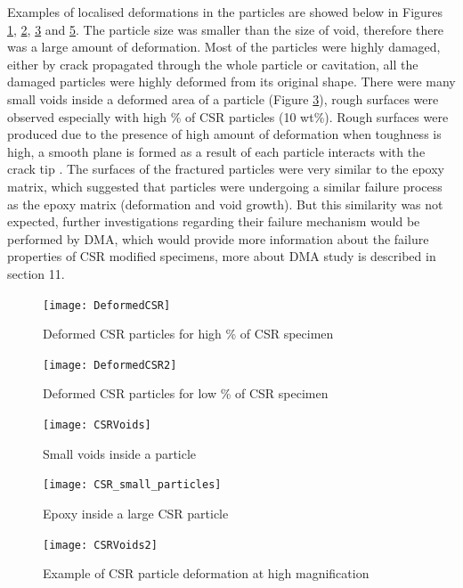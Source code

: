 \documentclass[numbers=noendperiod,chapterprefix=on]{icldt} %
\begin{document}
{Examples of localised deformations in the particles are showed below in Figures \ref{DeformedCSR}, \ref{DeformedCSR2}, \ref{CSRVoids} and \ref{CSRVoids2}. The particle size was smaller than the size of void, therefore there was a large amount of deformation. Most of the particles were highly damaged, either by crack propagated through the whole particle or cavitation, all the damaged particles were highly deformed from its original shape. There were many small voids inside a deformed area of a particle (Figure \ref{CSRVoids}), rough surfaces were observed especially with high \% of CSR particles (10 wt\%). Rough surfaces were produced due to the presence of high amount of deformation when toughness is high, a smooth plane is formed as a result of each particle interacts with the crack tip \cite{Bray2013}. The surfaces of the fractured particles were very similar to the epoxy matrix, which suggested that particles were undergoing a similar failure process as the epoxy matrix (deformation and void growth). But this similarity was not expected, further investigations regarding their failure mechanism would be performed by DMA, which would provide more information about the failure properties of CSR modified specimens, more about DMA study is described in section 11.

\begin{figure}[!htpb]
\centering
\texttt{[image: DeformedCSR]}
\caption{Deformed CSR particles for high \% of CSR specimen }\label{DeformedCSR}
\end{figure}
\FloatBarrier

\begin{figure}[!htpb]
\centering
\texttt{[image: DeformedCSR2]}
\caption{Deformed CSR particles for low \% of CSR specimen }\label{DeformedCSR2}
\end{figure}
\FloatBarrier

\begin{figure}[!htpb]
\centering
\texttt{[image: CSRVoids]}
\caption{Small voids inside a particle}\label{CSRVoids}
\end{figure}
\FloatBarrier

\begin{figure}[!htpb]
\centering
\texttt{[image: CSR\_small\_particles]}
\caption{Epoxy inside a large CSR particle}\label{CSR_small_particles}
\end{figure}
\FloatBarrier

\begin{figure}[!htpb]
\centering
\texttt{[image: CSRVoids2]}
\caption{Example of CSR particle deformation at high magnification }\label{CSRVoids2}
\end{figure}
\FloatBarrier

}
\end{document}
